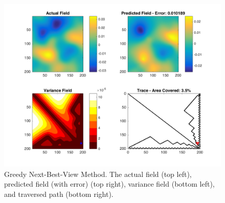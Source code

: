 \begin{figure}[htb!]
    \centering
    \includegraphics[width=0.8\linewidth]{figures/sim_figures/greedy_3_5p_200x200_sf_20_seed_2}
    \captionsetup{skip=0.25\baselineskip}
    \ssp
    \caption{Greedy Next-Best-View Method. The actual field (top left), predicted field (with error) (top right), variance field (bottom left), and traversed path (bottom right).}
\end{figure}
